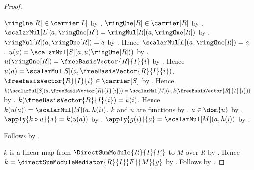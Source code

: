 \begin{proof}
\begin{subproof}
\begin{subproof}
            $\ringOne[R]\in\carrier[L]$ by
                .
            $\ringOne[R]\in\carrier[R]$ by .
            $\scalarMul[L](a,\ringOne[R])
                =\ringMul[R](a,\ringOne[R])$ by
                .
            $\ringMul[R](a,\ringOne[R])=a$ by
                .
            Hence $\scalarMul[L](a,\ringOne[R])=a$.
            $u(a)=\scalarMul[S](a,u(\ringOne[R]))$ by
                .
            $u(\ringOne[R])=\freeBasisVector{R}{I}{i}$ by
                .
            Hence $u(a)=\scalarMul[S](a,
                \freeBasisVector{R}{I}{i})$.
            $\freeBasisVector{R}{I}{i}\in\carrier[S]$ by
                .
            Hence
                $k(\scalarMul[S](a,\freeBasisVector{R}{I}{i}))
                    =\scalarMul[M](a,k(\freeBasisVector{R}{I}{i}))$ by
                .
            $k(\freeBasisVector{R}{I}{i})=h(i)$.
            Hence $k(u(a))=\scalarMul[M](a,h(i))$.
            $k$ and $u$ are functions by
                .
            $a\in\dom{u}$ by .
            $\apply{k\circ u}{a}=k(u(a))$ by .
            $\apply{g(i)}{a}=\scalarMul[M](a,h(i))$ by
                .
        \end{subproof}
        Follows by .
    \end{subproof}
    $k$ is a linear map from $\DirectSumModule{R}{I}{F}$ to $M$ over $R$ by
        .
    Hence $k=\directSumModuleMediator{R}{I}{F}{M}{g}$ by
        .
    Follows by .
\end{proof}
